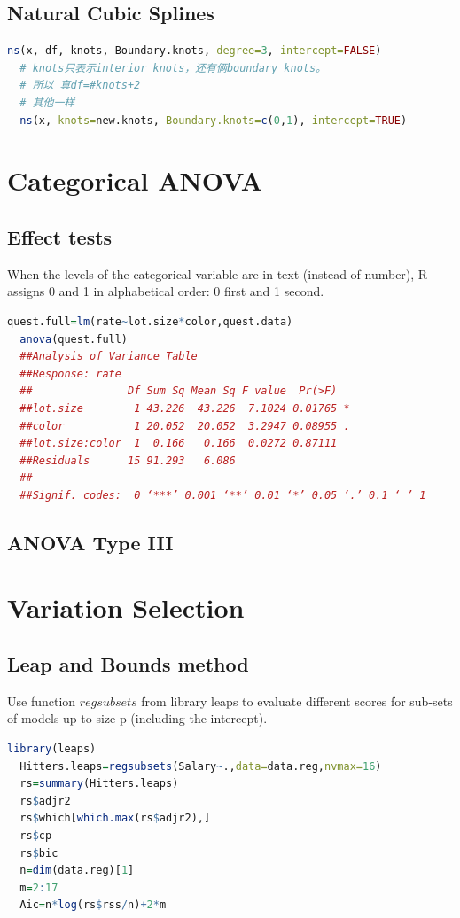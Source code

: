 \documentclass[11pt,a4paper]{article}
\begin{document}
\subsection{Natural Cubic Splines}
\begin{lstlisting}[language=R]
  ns(x, df, knots, Boundary.knots, degree=3, intercept=FALSE)
  # knots只表示interior knots，还有俩boundary knots。
  # 所以 真df=#knots+2
  # 其他一样
  ns(x, knots=new.knots, Boundary.knots=c(0,1), intercept=TRUE)
\end{lstlisting}



\section{Categorical ANOVA}
\subsection{Effect tests}
When the levels of the categorical variable are in text (instead of number), R assigns 0 and 1 in alphabetical order: 0 first and 1 second.

\begin{lstlisting}[language=R]
  quest.full=lm(rate~lot.size*color,quest.data)
  anova(quest.full)
  ##Analysis of Variance Table
  ##Response: rate
  ##               Df Sum Sq Mean Sq F value  Pr(>F)  
  ##lot.size        1 43.226  43.226  7.1024 0.01765 *
  ##color           1 20.052  20.052  3.2947 0.08955 .
  ##lot.size:color  1  0.166   0.166  0.0272 0.87111  
  ##Residuals      15 91.293   6.086                  
  ##---
  ##Signif. codes:  0 ‘***’ 0.001 ‘**’ 0.01 ‘*’ 0.05 ‘.’ 0.1 ‘ ’ 1
\end{lstlisting}

\subsection{ANOVA Type III}


\section{Variation Selection}
\subsection{Leap and Bounds method}
Use function $regsubsets$ from library leaps to evaluate different scores for sub-sets of models up to size p (including the intercept).
\begin{lstlisting}[language=R]
  library(leaps)
  Hitters.leaps=regsubsets(Salary~.,data=data.reg,nvmax=16)
  rs=summary(Hitters.leaps)
  rs$adjr2
  rs$which[which.max(rs$adjr2),]
  rs$cp
  rs$bic
  n=dim(data.reg)[1]
  m=2:17
  Aic=n*log(rs$rss/n)+2*m
\end{lstlisting}
\end{document}
